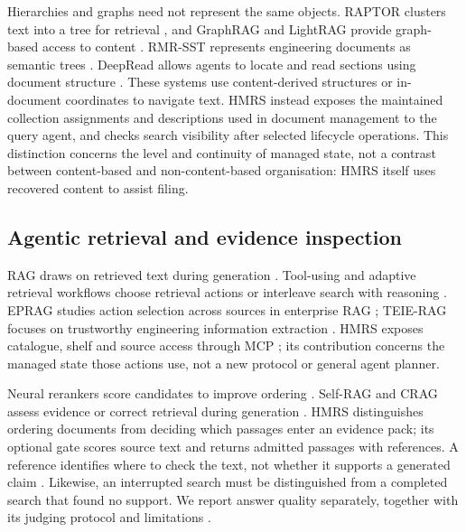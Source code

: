 Hierarchies and graphs need not represent the same objects. RAPTOR clusters
text into a tree for retrieval \citep{raptor}, and GraphRAG and LightRAG
provide graph-based access to content \citep{graphrag,lightrag}. RMR-SST
represents engineering documents as semantic trees
\citep{li-kbs-rmrsst-2026}. DeepRead allows agents to locate and read
sections using document structure \citep{deepread}. These systems use
content-derived structures or in-document coordinates to navigate text.
HMRS instead exposes the maintained collection assignments and descriptions
used in document management to the query agent, and checks search visibility
after selected lifecycle operations. This distinction concerns the level and
continuity of managed state, not a contrast between content-based and
non-content-based organisation: HMRS itself uses recovered content to assist
filing.

\subsection{Agentic retrieval and evidence inspection}

RAG draws on retrieved text during generation \citep{rag-lewis,gao-rag-survey-2023}.
Tool-using and adaptive retrieval workflows choose retrieval actions or
interleave search with reasoning \citep{react-yao,toolformer,ircot,adaptive-rag,modular-rag}.
EPRAG studies action selection across sources in enterprise RAG
\citep{kinalioglu-kbs-eprag-2026}; TEIE-RAG focuses on trustworthy engineering
information extraction \citep{shen-kbs-teierag-2026}. HMRS exposes catalogue,
shelf and source access through MCP \citep{mcp}; its contribution concerns
the managed state those actions use, not a new protocol or general agent
planner.

Neural rerankers score candidates to improve ordering
\citep{nogueira-monobert-2019,khattab-colbert-2020,sun-urara}. Self-RAG and
CRAG assess evidence or correct retrieval during generation
\citep{selfrag,crag}. HMRS distinguishes ordering documents from deciding
which passages enter an evidence pack; its optional gate scores source
text and returns admitted passages with references. A reference identifies
where to check the text, not whether it supports a generated claim
\citep{liu-verifiability,gao-citations}. Likewise, an interrupted search
must be distinguished from a completed search that found no support. We report answer quality separately, together with its judging protocol and
limitations \citep{zheng-llmjudge,panickssery-selfpref,wang-llmnotfair,es-ragas-2024,saad-falcon-ares-2024}.


